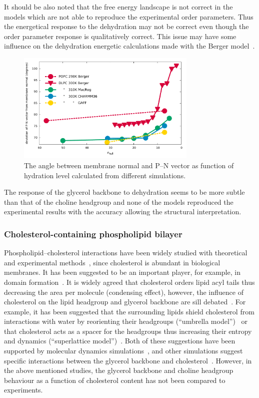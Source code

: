 \documentclass[journal=jacsat,manuscript=article]{achemso}
\begin{document}
It should be also noted that the free energy landscape is not correct in the models which
are not able to reproduce the experimental order parameters. Thus the energetical response
to the dehydration may not be correct even though the order parameter response is qualitatively correct.
This issue may have some influence on the dehydration energetic calculations made with the Berger model~\cite{eun09,schneck12}.
\begin{figure}[]
  \centering
  \includegraphics[width=8.6cm]{../Fig/dehydrationPN.pdf}

  \caption{\label{PNangle}
    The angle between membrane normal and P--N vector as function of
    hydration level calculated from different simulations.
  }
\end{figure}

The response of the glycerol backbone to dehydration seems to be more subtle than that of the choline headgroup 
and none of the models reproduced the experimental results with the accuracy allowing
the structural interpretation.


\subsubsection{Cholesterol-containing phospholipid bilayer}
Phospholipid--cholesterol interactions have been widely studied with theoretical~\cite{huang99,zhu07,rog09,alwarawrah12} and
experimental methods~\cite{brown78,marsh10,ferreira13,marsh13}, since cholesterol is abundant in biological membranes.
It has been suggested to be an important player, for example, in domain formation~\cite{simons04,somerharju09}.
It is widely agreed that cholesterol orders lipid acyl tails thus decreasing the area per molecule (condensing effect),
however, the influence of cholesterol on the lipid headgroup and glycerol backbone are sill debated~\cite{huang99,simons04,somerharju09}.
For example, it has been suggested that the surrounding lipids shield cholesterol from interactions with water by 
reorienting their headgroups (``umbrella model'')~\cite{huang99} or that cholesterol acts as a spacer for the headgroups thus increasing 
their entropy and dynamics (``superlattice model'')~\cite{somerharju09}. 
Both of these suggestions have been supported
by molecular dynamics simulations~\cite{zhu07,alwarawrah12}, and other simulations suggest specific
interactions between the glycerol backbone and cholesterol~\cite{rog09}. However,
in the above mentioned studies, the glycerol backbone and choline headgroup behaviour
as a function of cholesterol content has not been compared to experiments. 
\end{document}
